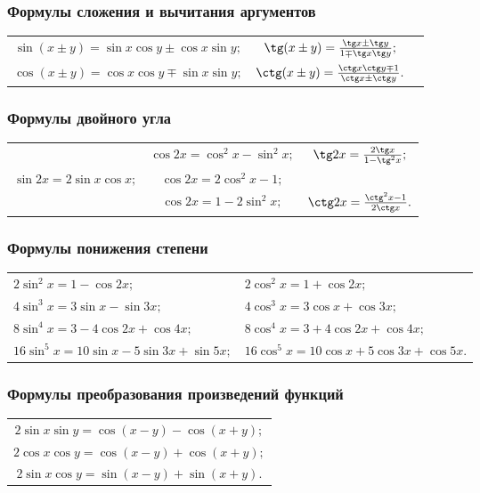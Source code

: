 \subsubsection{Формулы сложения и вычитания аргументов}
\noindent\begin{tabular}{ c c c}
$\sin(x\pm y)=\sin x \cos y \pm \cos x \sin y;$
&
$\tg(x\pm y)=\frac{\tg x \pm \tg y}{1 \mp \tg x\tg y};$
\\
$\cos(x\pm y)= \cos x \cos y \mp \sin x \sin y;$
&
$\ctg(x\pm y)=\frac{\ctg x\ctg y \mp 1}{\ctg x \pm \ctg y}.$
\end{tabular}

\subsubsection{Формулы двойного угла}
\noindent\begin{tabular}{ c c c }
&
$\cos 2x = \cos^2 x - \sin^2 x;$
&
\multirow{1}{*}{$\tg 2x = \frac{2\tg x}{1-\tg^2x};$}
\\
$\sin 2x = 2\sin x \cos x;$
&
$\cos 2x = 2\cos^2 x - 1; $
&
\\
&
$\cos 2x = 1 - 2\sin^2 x;$
&
$\ctg 2x = \frac{\ctg^2x-1}{2\ctg x}.$
\end{tabular}

\subsubsection{Формулы понижения степени}
\begin{tabular}{ l l }
$2\sin^2x=1-\cos 2x;$
&
$2\cos^2x=1+\cos 2x;$
\\
$4\sin^3x=3\sin x-\sin 3x;$
&
$4\cos^3x=3\cos x+\cos 3x;$
\\
$8\sin^4x=3-4\cos2x+\cos4x;$
&
$8\cos^4x=3+4\cos2x+\cos4x;$
\\
$16\sin^5x=10\sin x-5\sin 3x +\sin 5x;$
&
$16\cos^5x=10\cos x+5\cos 3x +\cos 5x.$
\end{tabular}

\subsubsection{Формулы преобразования произведений функций}
\begin{tabular}{c}
$2\sin x \sin y = \cos (x-y)-\cos(x+y);$
\\
$2\cos x \cos y = \cos (x-y)+\cos(x+y);$
\\
$2\sin x \cos y = \sin (x-y)+\sin(x+y).$
\end{tabular}

